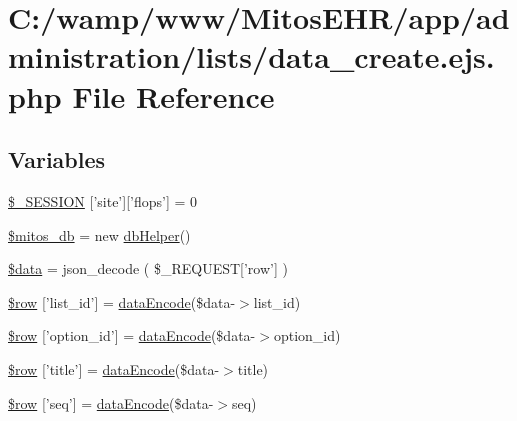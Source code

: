 \hypertarget{administration_2lists_2data__create_8ejs_8php}{\section{\-C\-:/wamp/www/\-Mitos\-E\-H\-R/app/administration/lists/data\-\_\-create.ejs.\-php \-File \-Reference}
\label{administration_2lists_2data__create_8ejs_8php}
}
\subsection*{\-Variables}
\begin{DoxyCompactItemize}
\item 
\hyperlink{administration_2lists_2data__create_8ejs_8php_a99fda8552a3e58235643b79f5af3ded8}{\$\-\_\-\-S\-E\-S\-S\-I\-O\-N} \mbox{[}'site'\mbox{]}\mbox{[}'flops'\mbox{]} = 0
\item 
\hyperlink{administration_2lists_2data__create_8ejs_8php_ab5d961f93efe4e2e8d8374f01dd6c65a}{\$mitos\-\_\-db} = new \hyperlink{classdb_helper}{db\-Helper}()
\item 
\hyperlink{administration_2lists_2data__create_8ejs_8php_a6efc15b5a2314dd4b5aaa556a375c6d6}{\$data} = json\-\_\-decode ( \$\-\_\-\-R\-E\-Q\-U\-E\-S\-T\mbox{[}'row'\mbox{]} )
\item 
\hyperlink{administration_2lists_2data__create_8ejs_8php_a76772cd03c99434f33a506cf72f49b4f}{\$row} \mbox{[}'list\-\_\-id'\mbox{]} = \hyperlink{data_exchange_8class_8php_a18220e6e744fcb46d788ed8b03b85f62}{data\-Encode}(\$data-\/$>$list\-\_\-id)
\item 
\hyperlink{administration_2lists_2data__create_8ejs_8php_ab8498685515a366e1b6d5caad5eb57ee}{\$row} \mbox{[}'option\-\_\-id'\mbox{]} = \hyperlink{data_exchange_8class_8php_a18220e6e744fcb46d788ed8b03b85f62}{data\-Encode}(\$data-\/$>$option\-\_\-id)
\item 
\hyperlink{administration_2lists_2data__create_8ejs_8php_a70d36cba6a35524466f2a4c8112c8e4e}{\$row} \mbox{[}'title'\mbox{]} = \hyperlink{data_exchange_8class_8php_a18220e6e744fcb46d788ed8b03b85f62}{data\-Encode}(\$data-\/$>$title)
\item 
\hyperlink{administration_2lists_2data__create_8ejs_8php_af07faae4f0734e368a485f115669527e}{\$row} \mbox{[}'seq'\mbox{]} = \hyperlink{data_exchange_8class_8php_a18220e6e744fcb46d788ed8b03b85f62}{data\-Encode}(\$data-\/$>$seq)

\end{DoxyCompactItemize}
